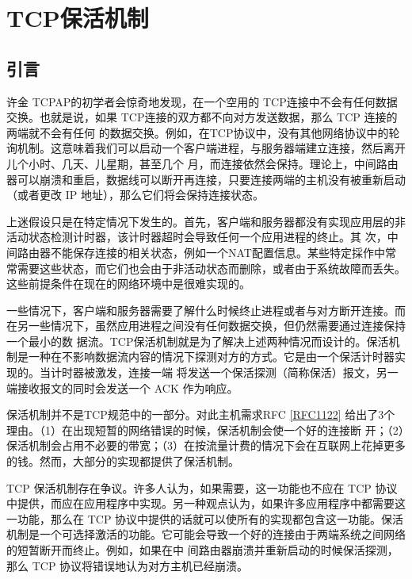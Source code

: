 \chapter{TCP保活机制}
\minitoc

\section{引言}
许金 TCPAP的初学者会惊奇地发现，在一个空用的 TCP连接中不会有任何数据交换。也就是说，如果 TCP连接的双方都不向对方发送数据，那么 TCP 连接的两端就不会有任何
的数据交换。例如，在TCP协议中，没有其他网络协议中的轮询机制。这意味着我们可以启动一个客户端进程，与服务器端建立连接，然后离开儿个小时、几天、儿星期，甚至几个
月，而连接依然会保持。理论上，中间路由器可以崩溃和重启，数据线可以断开再连接，只要连接两端的主机没有被重新启动（或者更改 IP 地址），那么它们将会保持连接状态。

\begin{tcolorbox}
    上迷假设只是在特定情况下发生的。首先，客户端和服务器都没有实现应用层的非活动状态检测计时器，该计时器超时会导致任何一个应用进程的终止。其
    次，中间路由器不能保存连接的相关状态，例如一个NAT配置信息。某些特定採作中常常需要这些状态，而它们也会由于非活动状态而删除，或者由于系统故障而丢失。这些前提条件在现在的网络环境中是很难实现的。
\end{tcolorbox}

一些情况下，客户端和服务器需要了解什么时候终止进程或者与对方断开连接。而在另一些情况下，虽然应用进程之间没有任何数据交换，但仍然需要通过连接保持一个最小的数
据流。TCP保活机制就是为了解决上述两种情况而设计的。保活机制是一种在不影响数据流内容的情况下探测对方的方式。它是由一个保活计时器实现的。当计时器被激发，连接一端
将发送一个保活探测（简称保活）报文，另一端接收报文的同时会发送一个 ACK 作为响应。

\begin{tcolorbox}
    保活机制并不是TCP规范中的一部分。对此主机需求RFC \href{https://www.rfc-editor.org/rfc/rfc1122}{[RFC1122]} 给出了3个理由。（1）在出现短暂的网络错误的时候，保活机制会使一个好的连接断
    开；（2）保活机制会占用不必要的带宽；（3）在按流量计费的情况下会在互联网上花掉更多的钱。然而，大部分的实现都提供了保活机制。
\end{tcolorbox}

TCP 保活机制存在争议。许多人认为，如果需要，这一功能也不应在 TCP 协议中提供，而应在应用程序中实现。另一种观点认为，如果许多应用程序中都需要这一功能，那么在
TCP 协议中提供的话就可以使所有的实现都包含这一功能。保活机制是一个可选择激活的功能。它可能会导致一个好的连接由于两端系统之间网络的短暂断开而终止。例如，如果在中
间路由器崩溃并重新启动的时候保活探测，那么 TCP 协议将错误地认为对方主机已经崩溃。

